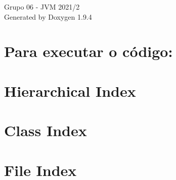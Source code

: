 \documentclass[twoside]{book}
\newcommand{\+}{\discretionary{\mbox{\scriptsize$\hookleftarrow$}}{}{}}
\newcommand{\clearemptydoublepage}{%
    \newpage{\pagestyle{empty}\cleardoublepage}%
  }
\begin{document}
  \raggedbottom
    \hypersetup{pageanchor=false,
                bookmarksnumbered=true,
                pdfencoding=unicode
               }
  \begin{titlepage}
  \vspace*{7cm}
  \begin{center}%
  {\Large Grupo 06 -\/  JVM 2021/2}\\
  \vspace*{1cm}
  {\large Generated by Doxygen 1.9.4}\\
  \end{center}
  \end{titlepage}
  \clearemptydoublepage
  \tableofcontents
  \clearemptydoublepage
  \hypersetup{pageanchor=true}
\chapter{Para executar o código\+:}
\label{index}\hypertarget{index}{}
\chapter{Hierarchical Index}

\chapter{Class Index}

\chapter{File Index}

\end{document}
